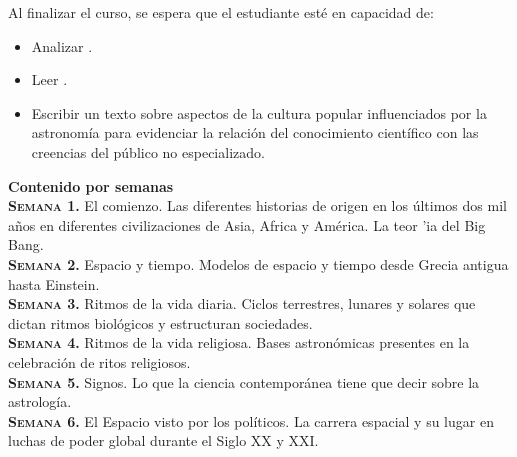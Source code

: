 \documentclass[letterpaper,10pt,onecolumn]{article}
\begin{document}

\noindent\normalsize Al finalizar el curso, se espera que el
estudiante est\'e en capacidad de: 

\begin{itemize}
\item Analizar .\\[-0.6cm]
\item Leer .\\[-0.6cm]
\item Escribir un texto sobre aspectos de la cultura popular
  influenciados por la astronom\'ia para evidenciar la relaci\'on del
  conocimiento cient\'ifico con las creencias del p\'ublico no
  especializado.\\[-0.2cm]  
\end{itemize}

\noindent\textbf{\large {} \quad Contenido por
  semanas}\\[-0.2cm] 


\noindent\normalsize \textbf{\textsc{Semana 1.}} El comienzo. Las
diferentes historias de origen en los \'ultimos dos mil a\~nos
en diferentes civilizaciones de Asia, Africa y Am\'erica. La teor
'ia del Big Bang.\\[-0.3cm]  


\noindent\textbf{\textsc{Semana 2.}} Espacio y tiempo. Modelos de
espacio y tiempo desde Grecia antigua hasta Einstein. \\[-0.3cm] 

\noindent\textbf{\textsc{Semana 3.}} Ritmos de la vida diaria. Ciclos
terrestres, lunares y solares que dictan ritmos biol\'ogicos y
estructuran sociedades. \\[-0.3cm] 

\noindent\textbf{\textsc{Semana 4.}} Ritmos de la vida
religiosa. Bases astron\'omicas presentes en la celebraci\'on de ritos
religiosos. \\[-0.3cm] 


\noindent\textbf{\textsc{Semana 5.}} Signos. Lo que la ciencia
contempor\'anea tiene que decir sobre la astrolog\'ia. \\[-0.3cm] 

\noindent\textbf{\textsc{Semana 6.}} El Espacio visto por los
pol\'iticos. La carrera espacial y su lugar en luchas de poder global
durante el Siglo XX y XXI.\\[-0.3cm]  
\end{document}

